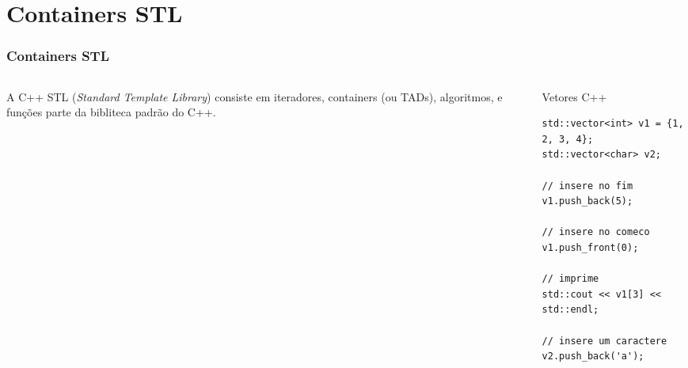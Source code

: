 \documentclass[xcolor={usenames,dvipsnames},10pt,presentation,aspectratio=169]{beamer}
\begin{document}
\section{Containers STL}
\begin{frame}[fragile]
  \frametitle{Containers STL}
  \vspace{-2mm}
    \begin{columns}
      \begin{column}{0.5\textwidth}
        A C++ STL (\emph{Standard Template Library}) consiste em iteradores,
        containers (ou TADs), algoritmos, e funções parte da bibliteca padrão
        do C++.
     \end{column}
      \begin{column}{0.5\textwidth}
  \begin{block}{Vetores C++}
\begin{lstlisting}
std::vector<int> v1 = {1, 2, 3, 4};
std::vector<char> v2;

// insere no fim
v1.push_back(5);

// insere no comeco
v1.push_front(0);

// imprime
std::cout << v1[3] << std::endl;

// insere um caractere
v2.push_back('a');
\end{lstlisting}
\end{block}
      \end{column}
    \end{columns}
\end{frame}
\end{document}
